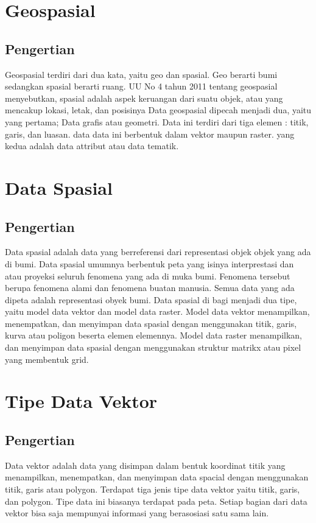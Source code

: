 \section{Geospasial}
\subsection{Pengertian}
Geospasial terdiri dari dua kata, yaitu geo dan spasial. Geo berarti bumi sedangkan spasial berarti 
ruang. UU No 4 tahun 2011 tentang geospasial menyebutkan, spasial adalah aspek keruangan dari suatu objek, 
atau yang mencakup lokasi, letak, dan posisinya
Data geospasial dipecah menjadi dua, yaitu yang pertama; Data grafis atau geometri. Data ini terdiri dari
tiga elemen : titik, garis, dan luasan. data data ini berbentuk dalam vektor maupun raster. yang kedua
adalah data attribut atau data tematik.

\section{Data Spasial}
\subsection{Pengertian}
Data spasial adalah data yang berreferensi dari representasi objek objek yang ada di bumi.
Data spasial umumnya berbentuk peta yang isinya interprestasi dan atau proyeksi seluruh 
fenomena yang ada di muka bumi. Fenomena tersebut berupa fenomena alami dan fenomena 
buatan manusia. Semua data yang ada dipeta adalah representasi obyek bumi.
Data spasial di bagi menjadi dua tipe, yaitu model data vektor dan model data raster. 
Model data vektor menampilkan, menempatkan, dan menyimpan data spasial dengan menggunakan 
titik, garis, kurva atau poligon beserta elemen elemennya. Model data raster menampilkan,
dan menyimpan data spasial dengan menggunakan struktur matrikx atau pixel yang membentuk grid.

\section{Tipe Data Vektor}
\subsection{Pengertian}
Data vektor adalah data yang disimpan dalam bentuk koordinat titik yang menampilkan, 
menempatkan, dan menyimpan data spacial dengan menggunakan titik, garis atau polygon.
Terdapat tiga jenis tipe data vektor yaitu titik, garis, dan polygon. Tipe data ini 
biasanya terdapat pada peta. Setiap bagian dari data vektor bisa saja mempunyai 
informasi yang berasosiasi satu sama lain.

